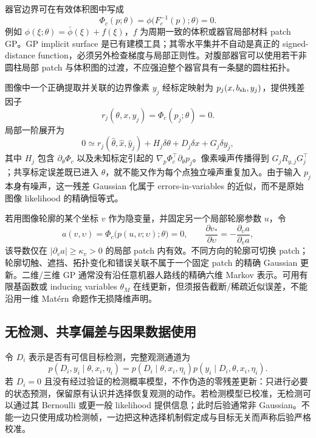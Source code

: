 \documentclass[11pt,a4paper]{article}
\numberwithin{equation}{section}
\theoremstyle{definition}
\newcommand{\abs}[1]{\left\lvert#1\right\rvert}
\begin{document}
器官边界可在有效体积图中写成
\begin{equation}
 \Phi_c(p;\theta)=\phi\bigl(F_c^{-1}(p);\theta\bigr)=0.
 \label{bel:organ-levelset}
\end{equation}
例如 $\phi(\xi;\theta)=\bar\phi(\xi)+f(\xi)$，$f$ 为周期一致的体积或器官局部材料 patch GP。GP implicit surface 是已有建模工具\cite{bel_dragiev2011}；其零水平集并不自动是真正的 signed-distance function，必须另外检查梯度与局部正则性。对腹部器官可以使用若干非圆柱局部 patch 与体积图的过渡，不应强迫整个器官具有一条腿的圆柱拓扑。

图像中一个正确提取并关联的边界像素 $y_j$ 经标定映射为 $p_j(x,b_{\rm sh},y_j)$，提供残差因子
\begin{equation}
 r_j(\theta,x,y_j)=\Phi_c(p_j;\theta)=0.
 \label{bel:organ-factor}
\end{equation}
局部一阶展开为
\begin{equation}
 0\simeq r_j(\hat\theta,\hat x,\hat y_j)
 +H_j\delta\theta+D_j\delta x+G_j\delta y_j,
 \label{bel:organ-factor-linear}
\end{equation}
其中 $H_j$ 包含 $\partial_\theta\Phi_c$ 以及未知标定引起的 $\nabla_p\Phi_c^\top\partial_\theta p_j$。像素噪声传播得到 $G_jR_{y,j}G_j^\top$；共享标定误差既已进入 $\theta$，就不能又作为每个点独立噪声重复加入。由于输入 $p_j$ 本身有噪声，这一残差 Gaussian 化属于 errors-in-variables 的近似，而不是原始图像 likelihood 的精确恒等式。

若用图像轮廓的某个坐标 $v$ 作为隐变量，并固定另一个局部轮廓参数 $u$，令
\begin{equation}
 a(v,\upsilon)=\Phi_c\bigl(p(u,v;\upsilon);\theta\bigr)=0,
 \qquad \frac{\partial v_*}{\partial\upsilon}
 =-\frac{\partial_{\upsilon} a}{\partial_v a},
 \label{bel:organ-root}
\end{equation}
该导数仅在 $\abs{\partial_v a}\ge\kappa_v>0$ 的局部 patch 内有效。不同方向的轮廓可切换 patch；轮廓切触、遮挡、拓扑变化和错误关联不属于一个固定 patch 的精确 Gaussian 更新。二维/三维 GP 通常没有沿任意机器人路线的精确六维 Markov 表示\cite{bel_sarkka2012}。可用有限基函数或 inducing variables $\theta_M$ 在线更新，但须报告截断/稀疏近似误差，不能沿用一维 Mat\'ern 命题作无损降维声明。

\subsection{无检测、共享偏差与因果数据使用}
\label{bel:missing}

令 $D_i$ 表示是否有可信目标检测，完整观测通道为
\begin{equation}
 p(D_i,y_i\mid\theta,x_i,\eta_i)
 =p(D_i\mid\theta,x_i,\eta_i)
 p(y_i\mid D_i,\theta,x_i,\eta_i).
 \label{bel:detection-channel}
\end{equation}
若 $D_i=0$ 且没有经过验证的检测概率模型，不作伪造的零残差更新：只进行必要的状态预测，保留原有认识并选择恢复观测的动作。若检测模型已校准，无检测可以通过其 Bernoulli 或更一般 likelihood 提供信息；此时后验通常非 Gaussian。不能一边只使用成功检测帧，一边把这种选择机制假定成与目标无关而声称后验严格校准。
\end{document}
